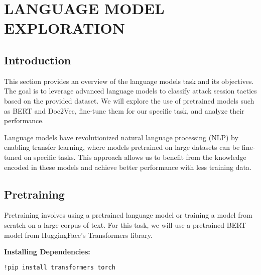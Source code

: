 

\section{LANGUAGE MODEL EXPLORATION}


    \subsection{Introduction}
    
        This section provides an overview of the language models task and its objectives. The goal is to leverage advanced language models to classify attack session tactics based on the provided dataset. We will explore the use of pretrained models such as BERT and Doc2Vec, fine-tune them for our specific task, and analyze their performance.

        Language models have revolutionized natural language processing (NLP) by enabling transfer learning, where models pretrained on large datasets can be fine-tuned on specific tasks. This approach allows us to benefit from the knowledge encoded in these models and achieve better performance with less training data.

    \subsection{Pretraining}
    
        Pretraining involves using a pretrained language model or training a model from scratch on a large corpus of text. For this task, we will use a pretrained BERT model from HuggingFace's Transformers library.

        \textbf{Installing Dependencies:}
        
        \vspace{0.5em}

        \begin{lstlisting}[language=bash, caption={Install required packages}, label={lst:install_packages}]
            !pip install transformers torch
        \end{lstlisting}

